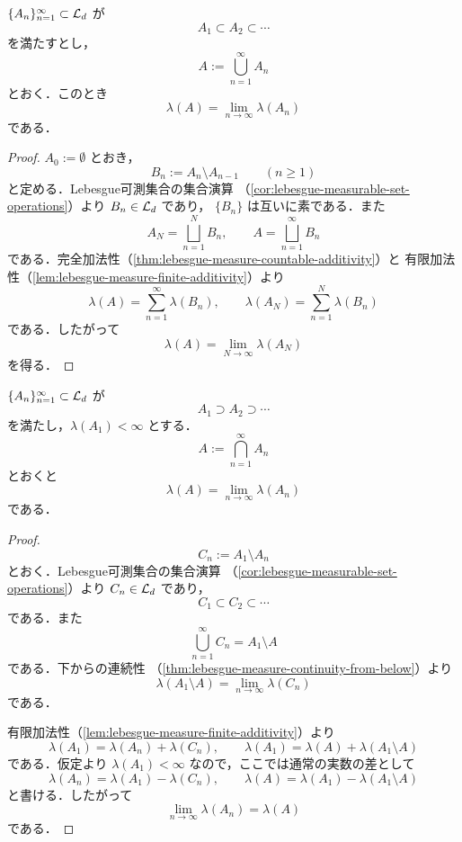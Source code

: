 \begin{theorem}[下からの連続性]\label{thm:lebesgue-measure-continuity-from-below}
$\{A_n\}_{n=1}^{\infty}\subset\mathcal L_d$ が
\[
A_1\subset A_2\subset \cdots
\]
を満たすとし，
\[
A:=\bigcup_{n=1}^{\infty}A_n
\]
とおく．このとき
\[
\lambda(A)=\lim_{n\to\infty}\lambda(A_n)
\]
である．
\end{theorem}
\begin{proof}
$A_0:=\emptyset$ とおき，
\[
B_n:=A_n\setminus A_{n-1}\qquad(n\ge1)
\]
と定める．Lebesgue可測集合の集合演算
（\cref{cor:lebesgue-measurable-set-operations}）より $B_n\in\mathcal L_d$ であり，
$\{B_n\}$ は互いに素である．また
\[
A_N=\bigsqcup_{n=1}^{N}B_n,
\qquad
A=\bigsqcup_{n=1}^{\infty}B_n
\]
である．完全加法性（\cref{thm:lebesgue-measure-countable-additivity}）と
有限加法性（\cref{lem:lebesgue-measure-finite-additivity}）より
\[
\lambda(A)=\sum_{n=1}^{\infty}\lambda(B_n),
\qquad
\lambda(A_N)=\sum_{n=1}^{N}\lambda(B_n)
\]
である．したがって
\[
\lambda(A)=\lim_{N\to\infty}\lambda(A_N)
\]
を得る．
\end{proof}

\begin{theorem}[上からの連続性]\label{thm:lebesgue-measure-continuity-from-above}
$\{A_n\}_{n=1}^{\infty}\subset\mathcal L_d$ が
\[
A_1\supset A_2\supset \cdots
\]
を満たし，$\lambda(A_1)<\infty$ とする．
\[
A:=\bigcap_{n=1}^{\infty}A_n
\]
とおくと
\[
\lambda(A)=\lim_{n\to\infty}\lambda(A_n)
\]
である．
\end{theorem}
\begin{proof}
\[
C_n:=A_1\setminus A_n
\]
とおく．Lebesgue可測集合の集合演算
（\cref{cor:lebesgue-measurable-set-operations}）より $C_n\in\mathcal L_d$ であり，
\[
C_1\subset C_2\subset\cdots
\]
である．また
\[
\bigcup_{n=1}^{\infty}C_n=A_1\setminus A
\]
である．下からの連続性
（\cref{thm:lebesgue-measure-continuity-from-below}）より
\[
\lambda(A_1\setminus A)
=
\lim_{n\to\infty}\lambda(C_n)
\]
である．

有限加法性（\cref{lem:lebesgue-measure-finite-additivity}）より
\[
\lambda(A_1)=\lambda(A_n)+\lambda(C_n),
\qquad
\lambda(A_1)=\lambda(A)+\lambda(A_1\setminus A)
\]
である．仮定より $\lambda(A_1)<\infty$ なので，ここでは通常の実数の差として
\[
\lambda(A_n)=\lambda(A_1)-\lambda(C_n),
\qquad
\lambda(A)=\lambda(A_1)-\lambda(A_1\setminus A)
\]
と書ける．したがって
\[
\lim_{n\to\infty}\lambda(A_n)=\lambda(A)
\]
である．
\end{proof}

